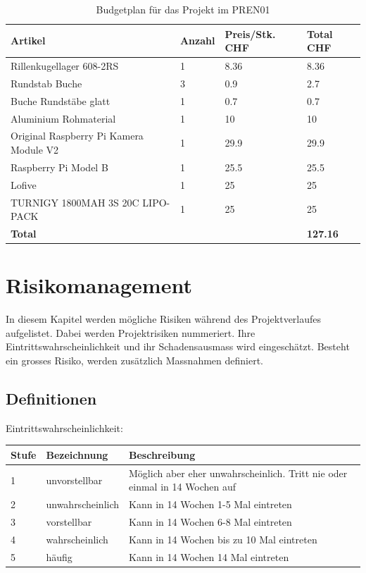 \documentclass[a4paper]{report}
\begin{document}
\vspace{1em}
\noindent
\begin{table}[h!]
	\begin{tabular}{|p{}|p{}|p{}||p{}|}
	\hline
	\textbf{Artikel} & \textbf{Anzahl} & \textbf{Preis/Stk. CHF} & \textbf{Total CHF} \\
	\hline
	Rillenkugellager 608-2RS & 1 & 8.36 & 8.36 \\
	\hline
	Rundstab Buche & 3 & 0.9 & 2.7 \\
	\hline
	Buche Rundstäbe glatt & 1 & 0.7 & 0.7 \\
	\hline
	Aluminium Rohmaterial & 1 & 10 & 10 \\
	\hline
	Original Raspberry Pi Kamera Module V2 & 1 & 29.9 & 29.9 \\
	\hline
	Raspberry Pi Model B & 1 & 25.5 & 25.5 \\
	\hline
	Lofive & 1 & 25 & 25 \\
	\hline
	TURNIGY 1800MAH 3S 20C LIPO-PACK & 1 & 25 & 25\\
	\hline
	\textbf{Total} & & & \textbf{127.16} \\
	\hline
	\end{tabular}
	\caption{Budgetplan für das Projekt im PREN01}
	\label{tab:Budgetplan}
\end{table}

\section{Risikomanagement}
\label{ch:RisikoMgmt}
In diesem Kapitel werden mögliche Risiken während des Projektverlaufes aufgelistet. Dabei werden Projektrisiken nummeriert. Ihre Eintrittswahrscheinlichkeit und ihr Schadensausmass wird eingeschätzt. Besteht ein grosses Risiko, werden zusätzlich Massnahmen definiert.

\subsection{Definitionen}
\label{sec:Def}
\vspace{1em}
\noindent
Eintrittswahrscheinlichkeit:

\vspace{1em}
\noindent
\begin{tabular}{|p{}|p{}|p{}|}
	\hline
	\textbf{Stufe} & \textbf{Bezeichnung} & \textbf{Beschreibung} \\
	\hline
	1 & unvorstellbar & Möglich aber eher unwahrscheinlich. Tritt nie oder einmal in 14 Wochen auf \\
	\hline
	2 & unwahrscheinlich & Kann in 14 Wochen 1-5 Mal eintreten\\
	\hline
	3 & vorstellbar & Kann in 14 Wochen 6-8 Mal eintreten \\
	\hline
	4 & wahrscheinlich & Kann in 14 Wochen bis zu 10 Mal eintreten \\
	\hline
	5 & häufig & Kann in 14 Wochen 14 Mal eintreten\\
	\hline
\end{tabular}
\end{document}
